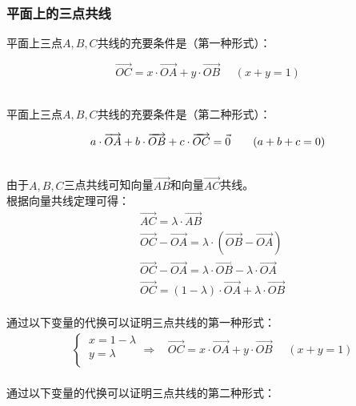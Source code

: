 \documentclass[UTF8]{ctexart}
\let\nvec\vec
\def\vec#1{\nvec{\vphantom b\smash{#1}}}
\begin{document}
\subsubsection{平面上的三点共线}
    \setcounter{equation}{0}
    平面上三点$A,B,C$共线的充要条件是（第一种形式）：
    \begin{large}
        \begin{equation*}
            \overrightarrow{OC}=x\cdot\overrightarrow{OA}+y\cdot\overrightarrow{OB}~~~~~~(x+y=1)
        \end{equation*}
    \end{large}\\
    平面上三点$A,B,C$共线的充要条件是（第二种形式）：
    \begin{large}
        \begin{equation*}
            a\cdot\overrightarrow{OA}+b\cdot\overrightarrow{OB}+c\cdot\overrightarrow{OC}=\vec{0}~~~~~~(a+b+c=0)
        \end{equation*}
    \end{large}\\
    由于$A,B,C$三点共线可知向量$\overrightarrow{AB}$和向量$\overrightarrow{AC}$共线。\\[3mm]
    根据向量共线定理可得：
    \begin{align}
        &\overrightarrow{AC}=\lambda\cdot\overrightarrow{AB}\\[3mm]
        &\overrightarrow{OC}-\overrightarrow{OA}=\lambda\cdot\left(\overrightarrow{OB}-\overrightarrow{OA}\right)\\[3mm]
        &\overrightarrow{OC}-\overrightarrow{OA}=\lambda\cdot\overrightarrow{OB}-\lambda\cdot\overrightarrow{OA}\\[3mm]
        &\overrightarrow{OC}=(1-\lambda)\cdot\overrightarrow{OA}+\lambda\cdot\overrightarrow{OB}
    \end{align}\\
    通过以下变量的代换可以证明三点共线的第一种形式：\vspace{3pt}
    \begin{align}
        &\begin{cases}
            ~x=1-\lambda\\[1mm]
            ~y=\lambda\\[1mm]
        \end{cases}\Longrightarrow~~~~\overrightarrow{OC}=x\cdot\overrightarrow{OA}+y\cdot\overrightarrow{OB}~~~~~~(x+y=1)
    \end{align}\\
    通过以下变量的代换可以证明三点共线的第二种形式：\vspace{3pt}
\end{document}
